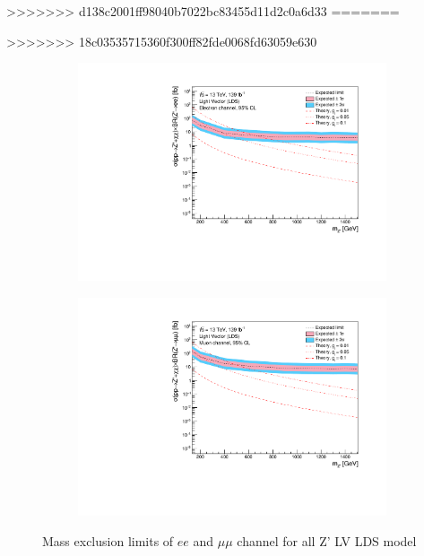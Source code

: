 \documentclass[12pt, a4paper]{book}
\begin{document}
>>>>>>> d138c2001ff98040b7022bc83455d11d2c0a6d33
=======

>>>>>>> 18c03535715360f300ff82fde0068fd63059e630
\begin{figure}[!ht]
	\centering
   \begin{subfigure}[b]{0.49\textwidth}
      \centering
      \includegraphics[width=1\textwidth]{Limits/LV_LDS/mass_exclusion_ee.pdf}
      \end{subfigure}
   \hfill
   \begin{subfigure}[b]{0.49\textwidth}
      \centering
      \includegraphics[width=1\textwidth]{Limits/LV_LDS/mass_exclusion_uu.pdf}
      \end{subfigure}
   \caption{Mass exclusion limits of $ee$ and $\mu\mu$ channel for all Z' LV LDS model}\label{fig:LV_LDS_exclusion_ee_uu}
\end{figure}
\clearpage
\end{document}
